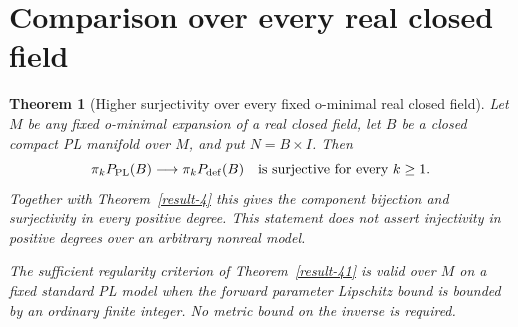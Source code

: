 \documentclass[11pt,a4paper]{article}
\newtheorem{theorem}{Theorem}[section]
\theoremstyle{definition}
\begin{document}
\section{Comparison over every real closed field}
\begin{theorem}[Higher surjectivity over every fixed o-minimal real closed field]\label{result-43}
Let $M$ be any fixed o-minimal expansion of a real closed field,
let $B$ be a closed compact PL manifold over $M$, and put
$N=B\times I$. Then
\begin{equation}
 \pi_k P_{\mathrm{PL}}(B)\longrightarrow
 \pi_k P_{\mathrm{def}}(B)
 \quad\hbox{is surjective for every }k\geq1.
 \label{equation-105}
\end{equation}
Together with Theorem~\ref{result-4} this gives the component bijection and
surjectivity in every positive degree. This statement does not
assert injectivity in positive degrees over an arbitrary
nonreal model.

The sufficient regularity criterion of Theorem~\ref{result-41} is valid over $M$ on a fixed standard PL model when the forward parameter Lipschitz bound is bounded by an ordinary finite integer. No metric bound on the inverse is required.
\end{theorem}
\end{document}
